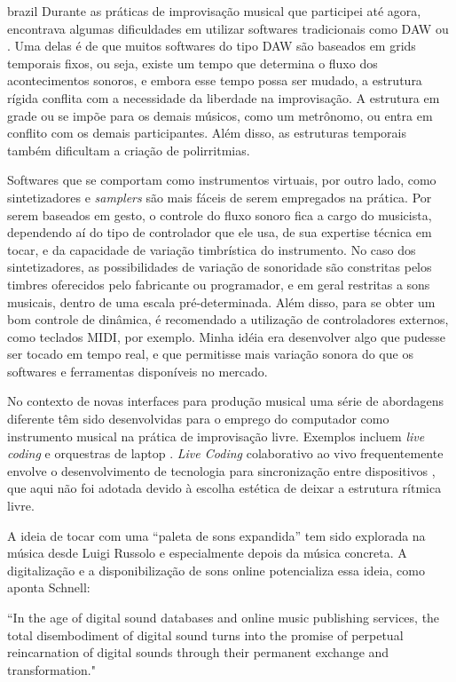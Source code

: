 \begin{otherlanguage*}{brazil}
Durante as práticas de improvisação musical que participei até agora, encontrava algumas dificuldades em utilizar softwares tradicionais como DAW ou . Uma delas é de que muitos softwares do tipo DAW são baseados em grids temporais fixos, ou seja, existe um tempo que determina o fluxo dos acontecimentos sonoros, e embora esse tempo possa ser mudado, a estrutura rígida conflita com a necessidade da liberdade na improvisação. A estrutura em grade ou se impõe para os demais músicos, como um metrônomo, ou entra em conflito com os demais participantes. Além disso, as estruturas temporais também dificultam a criação de polirritmias. 

Softwares que se comportam como instrumentos virtuais, por outro lado, como sintetizadores e \emph{samplers} são mais fáceis de serem empregados na prática. Por serem baseados em gesto, o controle do fluxo sonoro fica a cargo do musicista, dependendo aí do tipo de controlador que ele usa, de sua expertise técnica em tocar, e da capacidade de variação timbrística do instrumento. No caso dos sintetizadores, as possibilidades de variação de sonoridade são constritas pelos timbres oferecidos pelo fabricante ou programador, e em geral restritas a sons musicais, dentro de uma escala pré-determinada. Além disso, para se obter um bom controle de dinâmica, é recomendado a utilização de controladores externos, como teclados MIDI, por exemplo. Minha idéia era desenvolver algo que pudesse ser tocado em tempo real, e que permitisse mais variação sonora do que os softwares e ferramentas disponíveis no mercado.

No contexto de novas interfaces para produção musical uma série de abordagens diferente têm sido desenvolvidas para o emprego do computador como instrumento musical na prática de improvisação livre. Exemplos incluem \emph{live coding} \cite{freeman2011collaborative} e orquestras de laptop \cite{Albert2012}. \emph{Live Coding} colaborativo ao vivo frequentemente envolve o desenvolvimento de tecnologia para sincronização entre dispositivos \cite{Wilson2014}, que aqui não foi adotada devido à escolha estética de deixar a estrutura rítmica livre.

A ideia de tocar com uma ``paleta de sons expandida'' tem sido explorada na música desde Luigi Russolo  \cite{Merz2013} e especialmente depois da música concreta. A digitalização e a disponibilização de sons online potencializa essa ideia, como aponta Schnell:
\begin{citacao}
``In the age of digital sound databases and online music publishing services, the total disembodiment of digital sound turns into the promise of perpetual reincarnation of digital sounds through their permanent exchange and transformation."\cite{Schnell2013}
\end{citacao}


\end{otherlanguage*}
